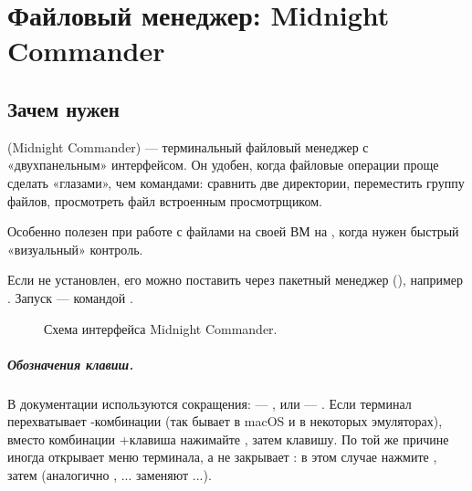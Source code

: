 \chapter{Файловый менеджер: Midnight Commander}
\label{ch:11-mc}

\section{Зачем нужен}

 (Midnight Commander) --- терминальный файловый
менеджер с «двухпанельным» интерфейсом. Он удобен, когда
файловые операции проще сделать «глазами», чем командами:
сравнить две директории, переместить группу файлов,
просмотреть файл встроенным просмотрщиком.

Особенно полезен при работе с файлами на своей ВМ на
, когда нужен быстрый «визуальный» контроль.

Если  не установлен, его можно поставить через
пакетный менеджер (), например
. Запуск --- командой .

\begin{figure}[htb]
  \centering
  \caption{Схема интерфейса Midnight Commander.}
  \label{fig:mc}
\end{figure}

\paragraph{Обозначения клавиш.}
В документации  используются сокращения:
 --- ,  или  --- .
Если терминал перехватывает -комбинации (так бывает
в macOS и в некоторых эмуляторах), вместо комбинации +клавиша
нажимайте , затем клавишу. По той же причине
 иногда открывает меню терминала, а не закрывает
: в этом случае нажмите , затем 
(аналогично , ... заменяют
...).

